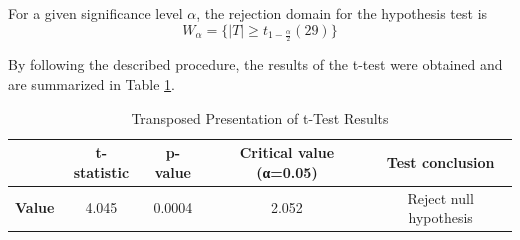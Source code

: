 \documentclass{mcmthesis}
\begin{document}
	For a given significance level $\alpha$, the rejection domain for the hypothesis test is
	\begin{equation*}
		W_\alpha = \big\{ |T| \ge t_{1-\frac{\alpha}{2}}(29) \big\}
	\end{equation*}
	
	By following the described procedure, the results of the t-test were obtained and are summarized in Table \ref{1}.


\begin{table}[H]
	\centering
	\caption{Transposed Presentation of t-Test Results}
	\label{table:H_t-test_result_transposed}
	\begin{tabular}{lcccc}
		\toprule
		\rowcolor{red!10}
		& \textbf{t-statistic} & \textbf{p-value} & \textbf{Critical value (α=0.05)} & \textbf{Test conclusion} \\
		\midrule
		\rowcolor{white} %
		\textbf{Value} & 4.045 & 0.0004 & 2.052 & Reject null hypothesis \\
		\bottomrule
	\end{tabular}
	\label{1}
\end{table}
	
\end{document}
